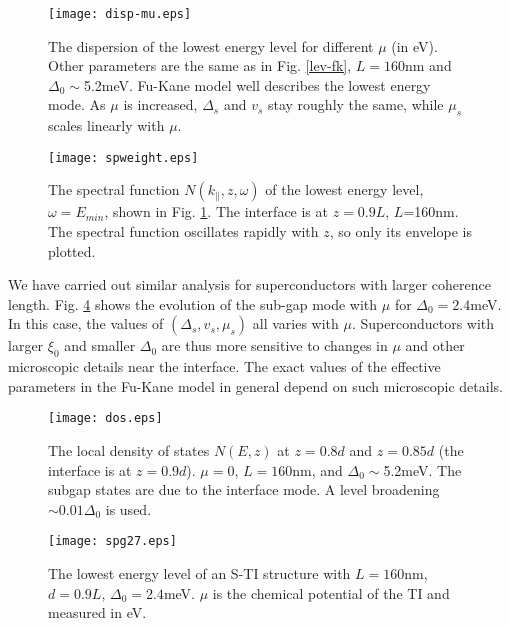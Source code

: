 \documentclass[11pt]{report}
\begin{document}
\begin{figure}
\texttt{[image: disp-mu.eps]}
\caption{The dispersion of the lowest energy level
for different $\mu$ (in eV). Other parameters
are the same as in Fig. \ref{lev-fk}, $L=160$nm and $\Delta_0\sim$5.2meV. Fu-Kane model
well describes the lowest energy mode. As $\mu$ is increased, 
$\Delta_s$ and $v_s$ stay roughly the same, while $\mu_s$ scales
linearly with $\mu$.
}\label{lev-chem}
\end{figure}

\begin{figure}
\texttt{[image: spweight.eps]}
\caption{The spectral function $N(k_\parallel,z,\omega)$ of the lowest 
energy level, $\omega=E_{min}$, shown in Fig. \ref{lev-chem}. 
The interface is at $z=0.9L$, $L$=160nm.
The spectral function oscillates rapidly with $z$, so only its envelope is plotted.
}\label{sp}
\end{figure}

We have carried out similar analysis for superconductors with larger
coherence length. Fig. \ref{level-27} shows the evolution of
the sub-gap mode with $\mu$ for $\Delta_0=2.4$meV. In this case,
the values of $(\Delta_s,v_s,\mu_s)$ all varies with $\mu$. 
Superconductors with larger $\xi_0$ and smaller $\Delta_0$ are thus more
sensitive to changes in $\mu$ and other microscopic details near
the interface. The exact values of the effective parameters 
in the Fu-Kane model in general depend on such microscopic details.

\begin{figure}
\texttt{[image: dos.eps]}
\caption{The local density of states $N(E,z)$
at $z=0.8d$ and $z=0.85d$ (the interface is at $z=0.9d$).
$\mu=0$, $L=160$nm, and $\Delta_0\sim$5.2meV. The subgap
states are due to the interface mode. A level broadening
$\sim 0.01\Delta_0$ is used.
}\label{dos}
\end{figure}

\begin{figure}
\texttt{[image: spg27.eps]}
\caption{The lowest energy level of an S-TI structure with $L=160$nm,
$d=0.9L$, $\Delta_0=2.4$meV. $\mu$ is the chemical potential of the TI and
measured in eV.}\label{level-27}
\end{figure}
\end{document}

